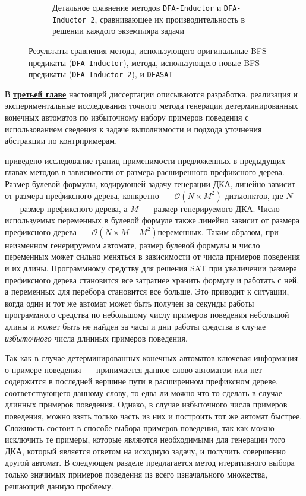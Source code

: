\begin{figure}[ht]
\begin{subfigure}[b]{0.48\textwidth}
    \caption{Детальное сравнение методов \texttt{DFA-Inductor} и \texttt{DFA-Inductor~2}, сравнивающее их производительность в решении каждого экземпляра задачи}
    \label{syn:img:plots:scatter}
  \end{subfigure}
  \caption{Результаты сравнения метода, использующего оригинальные BFS-предикаты (\texttt{DFA-Inductor}), метода, использующего новые BFS-предикаты (\texttt{DFA-Inductor~2}), и \texttt{DFASAT}}
  \label{syn:img:plots}
\end{figure}


В \textbf{\underline{третьей главе}} настоящей диссертации описываются разработка, реализация и экспериментальные исследования точного метода генерации детерминированных конечных автоматов по избыточному набору примеров поведения с использованием сведения к задаче выполнимости и подхода уточнения абстракции по контрпримерам.

\insection{\ref{sec:cegar:motivation}} приведено исследование границ применимости предложенных в предыдущих главах методов в зависимости от размера расширенного префиксного дерева. 
Размер булевой формулы, кодирующей задачу генерации ДКА, линейно зависит от размера префиксного дерева, конкретно~--- $\mathcal{O}\left(N \times M^{2}\right)$ дизъюнктов, где $N$~--- размер префиксного дерева, а $M$~--- размер генерируемого ДКА.
Число используемых переменных в булевой формуле также линейно зависит от размера префиксного дерева~--- $\mathcal{O}\left(N \times M + M^{2}\right) переменных.$
Таким образом, при неизменном генерируемом автомате, размер булевой формулы и число переменных может сильно меняться в зависимости от числа примеров поведения и их длины.
Программному средству для решения SAT при увеличении размера префиксного дерева становится все затратнее хранить формулу и работать с ней, а переменных для перебора становится все больше.
Это приводит к ситуации, когда один и тот же автомат может быть получен за секунды работы программного средства по небольшому числу примеров поведения небольшой длины и может быть не найден за часы и дни работы средства в случае \emph{избыточного} числа длинных примеров поведения.

Так как в случае детерминированных конечных автоматов ключевая информация о примере поведения~--- принимается данное слово автоматом или нет~--- содержится в последней вершине пути в расширенном префиксном дереве, соответствующего данному слову, то едва ли можно что-то сделать в случае длинных примеров поведения.
Однако, в случае избыточного числа примеров поведения, можно взять только часть из них и построить тот же автомат быстрее.
Сложность состоит в способе выбора примеров поведения, так как можно исключить те примеры, которые являются необходимыми для генерации того ДКА, который является ответом на исходную задачу, и получить совершенно другой автомат.
В следующем разделе предлагается метод итеративного выбора только значимых примеров поведения из всего изначального множества, решающий данную проблему.

